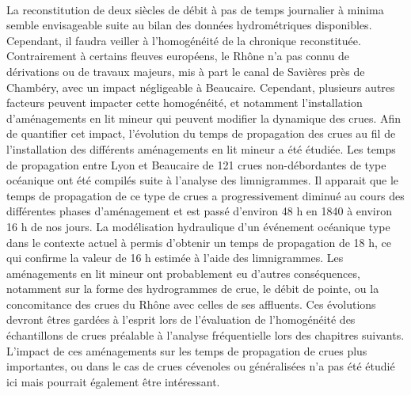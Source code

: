 	\paragraph{} La reconstitution de deux siècles de débit à pas de temps journalier à minima semble envisageable suite au bilan des données hydrométriques disponibles. Cependant, il faudra veiller à l'homogénéité de la chronique reconstituée. Contrairement à certains fleuves européens, le Rhône n'a pas connu de dérivations ou de travaux majeurs, mis à part le canal de Savières près de Chambéry, avec un impact négligeable à Beaucaire. Cependant, plusieurs autres facteurs peuvent impacter cette homogénéité, et notamment l'installation d'aménagements en lit mineur qui peuvent modifier la dynamique des crues. Afin de quantifier cet impact, l'évolution du temps de propagation des crues au fil de l'installation des différents aménagements en lit mineur a été étudiée. Les temps de propagation entre Lyon et Beaucaire de 121 crues non-débordantes de type océanique ont été compilés suite à l'analyse des limnigrammes. Il apparait que le temps de propagation de ce type de crues a progressivement diminué au cours des différentes phases d'aménagement et est passé d'environ 48 h en 1840 à environ 16 h de nos jours. La modélisation hydraulique d'un événement océanique type dans le contexte actuel à permis d'obtenir un temps de propagation de 18 h, ce qui confirme la valeur de 16 h estimée à l'aide des limnigrammes. Les aménagements en lit mineur ont probablement eu d'autres conséquences, notamment sur la forme des hydrogrammes de crue, le débit de pointe, ou la concomitance des crues du Rhône avec celles de ses affluents. Ces évolutions devront êtres gardées à l'esprit lors de l'évaluation de l'homogénéité des échantillons de crues préalable à l'analyse fréquentielle lors des chapitres suivants. L'impact de ces aménagements sur les temps de propagation de crues plus importantes, ou dans le cas de crues cévenoles ou généralisées n'a pas été étudié ici mais pourrait également être intéressant.
	
